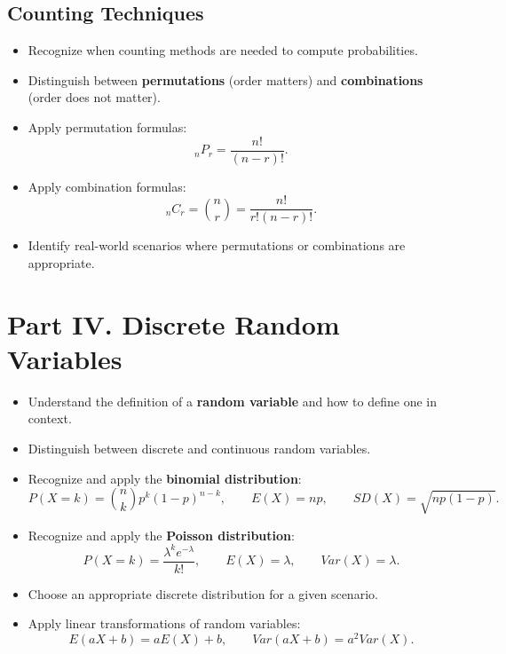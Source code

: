 \documentclass[11pt]{article}
\begin{document}


\subsection*{Counting Techniques}

\begin{itemize}[leftmargin=*]
\item Recognize when counting methods are needed to compute probabilities.
\item Distinguish between \textbf{permutations} (order matters) and \textbf{combinations} (order does not matter).

\item Apply permutation formulas:
\[
{}_nP_r = \frac{n!}{(n-r)!}.
\]

\item Apply combination formulas:
\[
{}_nC_r = {n \choose r} = \frac{n!}{r!(n-r)!}.
\]

\item Identify real-world scenarios where permutations or combinations are appropriate.
\end{itemize}

\section*{Part IV. Discrete Random Variables}

\begin{itemize}[leftmargin=*]
\item Understand the definition of a \textbf{random variable} and how to define one in context.

\item Distinguish between discrete and continuous random variables.

\item Recognize and apply the \textbf{binomial distribution}:
\[
P(X = k) = {n \choose k} p^k (1-p)^{n-k}, 
\qquad 
E(X)=np, 
\qquad 
SD(X)=\sqrt{np(1-p)}.
\]

\item Recognize and apply the \textbf{Poisson distribution}:
\[
P(X = k) = \frac{\lambda^k e^{-\lambda}}{k!}, 
\qquad 
E(X)=\lambda, 
\qquad 
Var(X)=\lambda.
\]

\item Choose an appropriate discrete distribution for a given scenario.

\item Apply linear transformations of random variables:
\[
E(aX+b)=aE(X)+b, 
\qquad 
Var(aX+b)=a^2Var(X).
\]
\end{itemize}
\end{document}
